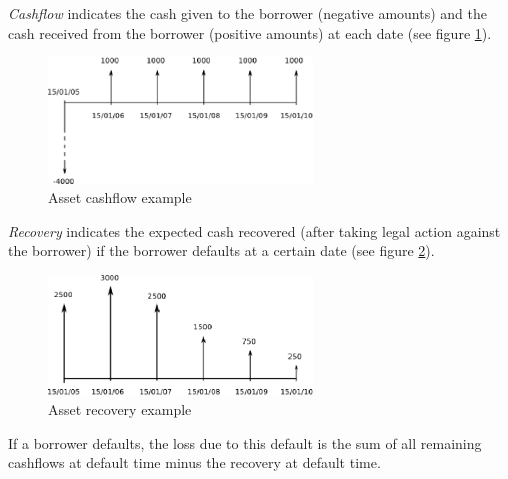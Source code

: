 \documentclass[a4paper,12pt,final]{article}
\begin{document}
\emph{Cashflow} indicates the cash given to the borrower (negative amounts) and the
cash received from the borrower (positive amounts) at each date (see figure \ref{cashflow}).

\begin{figure}[!hbt]
\begin{center}
\includegraphics[width=7cm, angle=0]{./images/cashflow.eps}
\caption{Asset cashflow example}
\label{cashflow}
\end{center}
\end{figure}
\FloatBarrier

\emph{Recovery} indicates the expected cash recovered (after taking legal action against 
the borrower) if the borrower defaults at a certain date (see figure \ref{recovery}).

\begin{figure}[!hbt]
\begin{center}
\includegraphics[width=7cm, angle=0]{./images/recovery.eps}
\caption{Asset recovery example}
\label{recovery}
\end{center}
\end{figure}
\FloatBarrier

If a borrower defaults, the loss due to this default is the sum of all remaining
cashflows at default time minus the recovery at default time.
\end{document}
